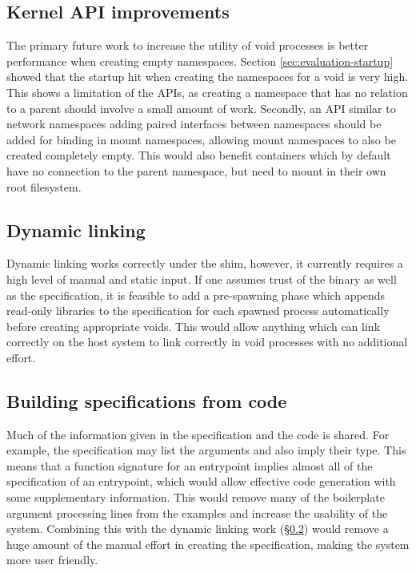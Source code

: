 \documentclass[12pt,a4paper,twoside]{report}
\begin{document}
\subsection{Kernel API improvements}
\label{sec:future-work-kernel-api}

The primary future work to increase the utility of void processes is better performance when creating empty namespaces. Section \ref{sec:evaluation-startup} showed that the startup hit when creating the namespaces for a void is very high. This shows a limitation of the APIs, as creating a namespace that has no relation to a parent should involve a small amount of work. Secondly, an API similar to network namespaces adding paired interfaces between namespaces should be added for binding in mount namespaces, allowing mount namespaces to also be created completely empty. This would also benefit containers which by default have no connection to the parent namespace, but need to mount in their own root filesystem.

\subsection{Dynamic linking}
\label{sec:future-work-dynamic-linking}

Dynamic linking works correctly under the shim, however, it currently requires a high level of manual and static input. If one assumes trust of the binary as well as the specification, it is feasible to add a pre-spawning phase which appends read-only libraries to the specification for each spawned process automatically before creating appropriate voids. This would allow anything which can link correctly on the host system to link correctly in void processes with no additional effort.

\subsection{Building specifications from code}
\label{sec:future-work-macros}

Much of the information given in the specification and the code is shared. For example, the specification may list the arguments and also imply their type. This means that a function signature for an entrypoint implies almost all of the specification of an entrypoint, which would allow effective code generation with some supplementary information. This would remove many of the boilerplate argument processing lines from the examples and increase the usability of the system. Combining this with the dynamic linking work (§\ref{sec:future-work-dynamic-linking}) would remove a huge amount of the manual effort in creating the specification, making the system more user friendly.
\end{document}
